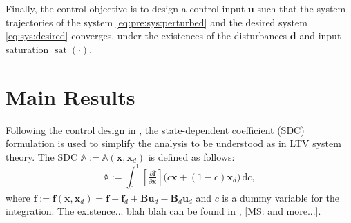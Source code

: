 \documentclass{ifacconf}
\newcommand{\MSRY}[1]{{\color{Peach} [MS: #1]}} %
\newcommand{\ctxt}[2]{{\color{#1}{#2}\color{black}}}
\newcommand{\cred}[1]{{\ctxt{awesome}{#1}}}
\newcommand*{\mv}[1]{\boldsymbol{#1}} %
\newcommand*{\mm}[1]{\boldsymbol{#1}} %
\DeclareMathOperator{\mysat}{{sat}}       %
\newcommand\der{\mathrm d}
\newcommand*{\pptfrac}[2]{
   \tfrac{\partial {#1}}{\partial {#2}}
}
\begin{document}
Finally, the control objective is to design a control input $\mv{u}$ such that the system trajectories of the system \eqref{eq:pre:sys:perturbed} and the desired system \eqref{eq:sys:desired} converges, under the existences of the disturbances $\mv{d}$ and input saturation $\mysat(\cdot)$.

\section{Main Results}

\cred{
   \begin{itemize}
      \item 포화에 대한 영향을 강조하기 위한 내용 추가 (리마크)
      \item hard contraint를 쓰지 않고 LMI에 통합    
   \end{itemize}
}

Following the control design in \cite{Tsukamoto:2021af}, the state-dependent coefficient (SDC) formulation \cite{Dani:2015aa} is used to simplify the analysis to be understood as in LTV system theory.
The SDC $\mathbb{A}:=\mathbb{A}(\mv{x},\mv{x}_d)$ is defined as follows:
\begin{equation} \label{eq:SDC}
   \mathbb{A}
   :=
   \textstyle\int_0^1 
   \left[
      \pptfrac{\overline{\mv{f}}}{\mv{x}}     
   \right]
   \big(
      c \mv{x} + (1-c) \mv{x}_d
   \big)
   \,
   \der c
   ,
\end{equation}
where 
$
   \overline{\mv{f}}
   :=
   \overline{\mv{f}} (\mv{x},\mv{x}_d)
   =
   \mv{f}-\mv{f}_d
   + \mm{B} \mv{u}_d 
   - \mm{B}_d \mv{u}_d
$
and $c$ is a dummy variable for the integration.
The existence... blah blah can be found in \cite{Dani:2015aa}, \MSRY{and more...}.
\end{document}
